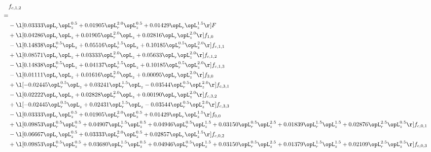 \begin{alignat}{2} 
\label{eq:f_12_1} 
& f_{c,1,2} \nonumber \\ 
 = \\ 
& - \l[  0.03333 \opL_r \opL_z^{0.5} +  0.01905 \opL_r^{2.0} \opL_z^{0.5} +  0.01429 \opL_r \opL_z^{1.5}  \r] F \nonumber \\ 
& + \l[  0.04286 \opL_r \opL_z +  0.01905 \opL_r^{2.0} \opL_z +  0.02816 \opL_r \opL_z^{2.0}  \r] f_{1,0} \nonumber \\ 
& - \l[  0.14838 \opL_r^{0.5} \opL_z +  0.05516 \opL_r^{1.5} \opL_z +  0.10185 \opL_r^{0.5} \opL_z^{2.0}  \r] f_{c,1,1} \nonumber \\ 
& + \l[  0.08571 \opL_r \opL_z +  0.03333 \opL_r^{2.0} \opL_z +  0.05633 \opL_r \opL_z^{2.0}  \r] f_{c,1,2} \nonumber \\ 
& - \l[  0.14838 \opL_r^{0.5} \opL_z +  0.04137 \opL_r^{1.5} \opL_z +  0.10185 \opL_r^{0.5} \opL_z^{2.0}  \r] f_{c,1,3} \nonumber \\ 
& - \l[  0.01111 \opL_r \opL_z +  0.01616 \opL_r^{2.0} \opL_z +  0.00095 \opL_r \opL_z^{2.0}  \r] f_{3,0} \nonumber \\ 
& + \l[  -0.02445 \opL_r^{0.5} \opL_z +  0.03241 \opL_r^{1.5} \opL_z   -0.03544 \opL_r^{0.5} \opL_z^{2.0}  \r] f_{c,3,1} \nonumber \\ 
& - \l[  0.02222 \opL_r \opL_z +  0.02828 \opL_r^{2.0} \opL_z +  0.00190 \opL_r \opL_z^{2.0}  \r] f_{c,3,2} \nonumber \\ 
& + \l[  -0.02445 \opL_r^{0.5} \opL_z +  0.02431 \opL_r^{1.5} \opL_z   -0.03544 \opL_r^{0.5} \opL_z^{2.0}  \r] f_{c,3,3} \nonumber \\ 
& - \l[  0.03333 \opL_r \opL_z^{0.5} +  0.01905 \opL_r^{2.0} \opL_z^{0.5} +  0.01429 \opL_r \opL_z^{1.5}  \r] f_{0,0} \nonumber \\ 
& + \l[  0.09853 \opL_r^{0.5} \opL_z^{0.5} +  0.04907 \opL_r^{1.5} \opL_z^{0.5} +  0.04946 \opL_r^{0.5} \opL_z^{1.5} +  0.03150 \opL_r^{0.5} \opL_z^{2.5} +  0.01839 \opL_r^{1.5} \opL_z^{1.5} +  0.02876 \opL_r^{2.5} \opL_z^{0.5}  \r] f_{c,0,1} \nonumber \\ 
& - \l[  0.06667 \opL_r \opL_z^{0.5} +  0.03333 \opL_r^{2.0} \opL_z^{0.5} +  0.02857 \opL_r \opL_z^{1.5}  \r] f_{c,0,2} \nonumber \\ 
& + \l[  0.09853 \opL_r^{0.5} \opL_z^{0.5} +  0.03680 \opL_r^{1.5} \opL_z^{0.5} +  0.04946 \opL_r^{0.5} \opL_z^{1.5} +  0.03150 \opL_r^{0.5} \opL_z^{2.5} +  0.01379 \opL_r^{1.5} \opL_z^{1.5} +  0.02109 \opL_r^{2.5} \opL_z^{0.5}  \r] f_{c,0,3} \nonumber \\ 

\end{alignat}
